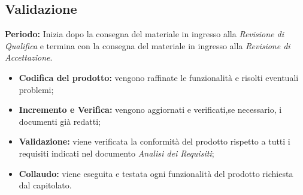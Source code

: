 \subsection{Validazione}
    \textbf{Periodo:}
    Inizia dopo la consegna del materiale in ingresso alla \emph{Revisione di Qualifica} e termina con la consegna del materiale in ingresso alla \emph{Revisione di Accettazione}.
    \begin{itemize}
    	\item \textbf{Codifica del prodotto:} vengono raffinate le funzionalità e risolti eventuali problemi;
    	\item \textbf{Incremento e Verifica:} vengono aggiornati e verificati,se necessario, i documenti già redatti; 
    	\item \textbf{Validazione:} viene verificata la conformità del prodotto rispetto a tutti i requisiti indicati nel documento \emph{Analisi dei Requisiti};
    	\item \textbf{Collaudo:} viene eseguita e testata ogni funzionalità del prodotto richiesta dal capitolato.
    \end{itemize}
